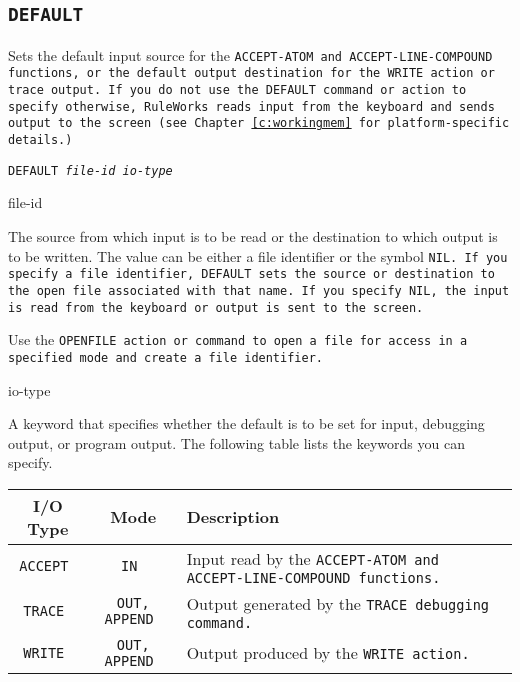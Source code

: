 \subsection{\tt{DEFAULT}}

Sets the default input source for the \tt{ACCEPT-ATOM} and
\tt{ACCEPT-LINE-COMPOUND} functions, or the default output destination
for the \tt{WRITE} action or trace output. If you do not use the
\tt{DEFAULT} command or action to specify otherwise, RuleWorks reads
input from the keyboard and sends output to the screen (see Chapter~\ref{c:workingmem} for platform-specific details.)

\Format

\tt{DEFAULT} \it{file-id} \it{io-type}

\begin{arguments}
\item[file-id]

  The source from which input is to be read or the destination to
  which output is to be written. The value can be either a file
  identifier or the symbol \tt{NIL}. If you specify a file identifier,
  \tt{DEFAULT} sets the source or destination to the open file
  associated with that name. If you specify \tt{NIL}, the input is
  read from the keyboard or output is sent to the screen.

  Use the \tt{OPENFILE} action or command to open a file for access in
  a specified mode and create a file identifier.

\item[io-type]

  A keyword that specifies whether the default is to be set for input,
  debugging output, or program output. The following table lists the
  keywords you can specify.
\end{arguments}

\begin{tabularx}{\columnwidth}{ccX}
  \toprule   
  I/O Type & Mode  &       Description  \\
  \midrule
  \tt{ACCEPT} & \tt{IN}  &  Input read by the \tt{ACCEPT-ATOM}
                           and \tt{ACCEPT-LINE-COMPOUND}
                           functions. \\
  \tt{TRACE} & \tt{OUT}, \tt{APPEND}  & Output generated by the \tt{TRACE} debugging command. \\
  \tt{WRITE} & \tt{OUT}, \tt{APPEND} & Output produced by the \tt{WRITE} action. \\
  \bottomrule
\end{tabularx}


